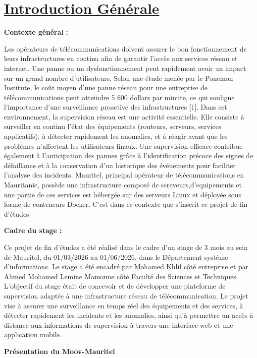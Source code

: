 \documentclass[12pt,a4paper]{report}
\newcommand{\ub}[1]{\uline{\textbf{#1}}}
\begin{document}
\section*{\ub{Introduction Générale}}
\textbf{Contexte général :}\par
Les opérateurs de télécommunications doivent assurer le bon fonctionnement de leurs infrastructures en continu afin de garantir l’accès aux services réseau et internet. Une panne ou un dysfonctionnement peut rapidement avoir un impact sur un grand nombre d’utilisateurs. Selon une étude menée par le Ponemon Institute, le coût moyen d'une panne réseau pour une entreprise de télécommunications peut atteindre 5 600 dollars par minute, ce qui souligne l'importance d'une surveillance proactive des infrastructures [1]. Dans cet environnement, la supervision réseau est une activité essentielle. Elle consiste à surveiller en continu l'état des équipements (routeurs, serveurs, services applicatifs), à détecter rapidement les anomalies, et à réagir avant que les problèmes n'affectent les utilisateurs finaux. Une supervision efficace contribue également à l’anticipation des pannes grâce à l’identification précoce des signes de défaillance et à la conservation d’un historique des événements pour faciliter l’analyse des incidents. Mauritel, principal opérateur de télécommunications en Mauritanie, possède une infrastructure composé de sereveurs,d’equipements et une partie de ces services est hébergée sur des serveurs Linux et déployée sous forme de conteneurs Docker. C'est dans ce contexte que s'inscrit ce projet de fin d'études\par
\textbf{Cadre du stage :}\par
Ce projet de fin d’études a été réalisé dans le cadre d’un stage de 3 mois au sein de Mauritel, du 01/03/2026 au 01/06/2026, dans le Département système d’informations. Le stage a été encadré par Mohamed Khlil côté entreprise et par Ahmed Mohamed Lemine Mamoune côté Faculté des Sciences et Techniques. L’objectif du stage était de concevoir et de développer une plateforme de supervision adaptée à une infrastructure réseau de télécommunication. Le projet vise à assurer une surveillance en temps réel des équipements et des services, à détecter rapidement les incidents et les anomalies, ainsi qu’à permettre un accès à distance aux informations de supervision à travers une interface web et une application mobile.\par
\textbf{Présentation du Moov-Mauritel}\par
\end{document}
